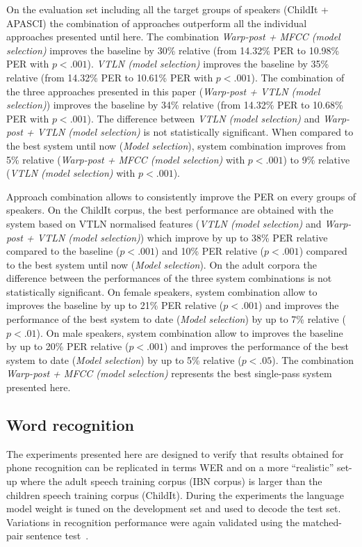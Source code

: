 \documentclass{nle}
\begin{document}
On the evaluation set including all the target groups of speakers (ChildIt + APASCI) the combination of approaches outperform all the individual approaches presented until here. The combination {\em Warp-post + MFCC (model selection)} improves the baseline by 30\% relative (from 14.32\% PER to 10.98\% PER with $p  <.001$). {\em VTLN (model selection)} improves the baseline by 35\% relative (from 14.32\% PER to 10.61\% PER with $p  <.001$). The combination of the three approaches presented in this paper ({\em Warp-post + VTLN (model selection)}) improves the baseline by 34\% relative (from 14.32\% PER to 10.68\% PER with $p  <.001$). The difference between {\em VTLN (model selection)} and {\em Warp-post + VTLN (model selection)} is not statistically significant. When compared to the best system until now ({\em Model selection}), system combination improves from 5\% relative ({\em Warp-post + MFCC (model selection)} with $p  <.001$) to 9\% relative ({\em VTLN (model selection)} with $p  <.001$).

Approach  combination allows to consistently improve the PER on every groups of speakers. On the ChildIt corpus, the best performance are obtained with the system based on VTLN normalised features ({\em VTLN (model selection)} and {\em Warp-post + VTLN (model selection)}) which improve by up to 38\% PER relative compared to the baseline ($p  <.001$) and 10\% PER relative ($p  <.001$) compared to the best system until now ({\em Model selection}). On the adult corpora the difference between the performances of the three system combinations is not statistically significant. On female speakers, system combination allow to improves the baseline by up to 21\% PER relative ($p  <.001$) and improves the performance of the best system to date ({\em Model selection}) by up to 7\% relative ($p  <.01$). On male speakers, system combination allow to improves the baseline by up to 20\% PER relative ($p  <.001$) and improves the performance of the best system to date ({\em Model selection}) by up to 5\% relative ($p  <.05$). The combination {\em Warp-post + MFCC (model selection)} represents the best single-pass system presented here.


\subsection{Word recognition}
The experiments presented here are designed to verify that results obtained for phone recognition can be replicated  in terms WER and on a more ``realistic'' set-up where the adult speech training corpus (IBN corpus) is larger than the children speech training corpus (ChildIt). During the experiments the language model weight is tuned on the development set and used to decode the test set. Variations  in recognition performance were again validated using the matched-pair  sentence test~\citep{GilCox89}. 
\end{document}

